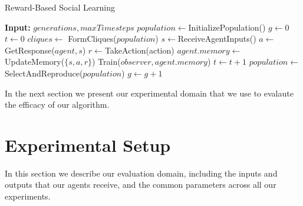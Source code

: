 \documentclass{acm_proc_article-sp}
\begin{document}
\begin{algorithm}
\caption{Reward-Based Social Learning}
\label{reward-algorithm}
\begin{algorithmic}
\STATE \textbf{Input:} $generations, maxTimesteps$
\STATE $population \leftarrow$InitializePopulation()
\STATE $g \leftarrow 0$
\STATE $t \leftarrow 0$
\LOOP
{}
  \STATE $cliques \leftarrow$ FormCliques($population$)
        \STATE $s \leftarrow $ReceiveAgentInputs()
        \STATE $a \leftarrow $GetResponse($agent, s$)
        \STATE $r \leftarrow $TakeAction(action)
        \STATE $agent.memory \leftarrow $UpdateMemory($\{s, a, r\}$)
      \ENDFOR
          \STATE Train($observer, agent.memory$)
        \ENDFOR
      \ENDIF
    \ENDFOR
    \ENDFOR
    \STATE $t \leftarrow t + 1$
  \ENDWHILE
  \STATE $population \leftarrow$SelectAndReproduce($population$)
  \STATE $g \leftarrow g + 1$
\ENDWHILE
\ENDLOOP
\end{algorithmic}
\end{algorithm}



In the next section we present our experimental domain that we use to evalaute the efficacy of our algorithm.

\section{Experimental Setup}
\label{sec:setup}
In this section we describe our evaluation domain, including the inputs and outputs that our agents receive, and the common parameters across all our experiments.
\end{document}

